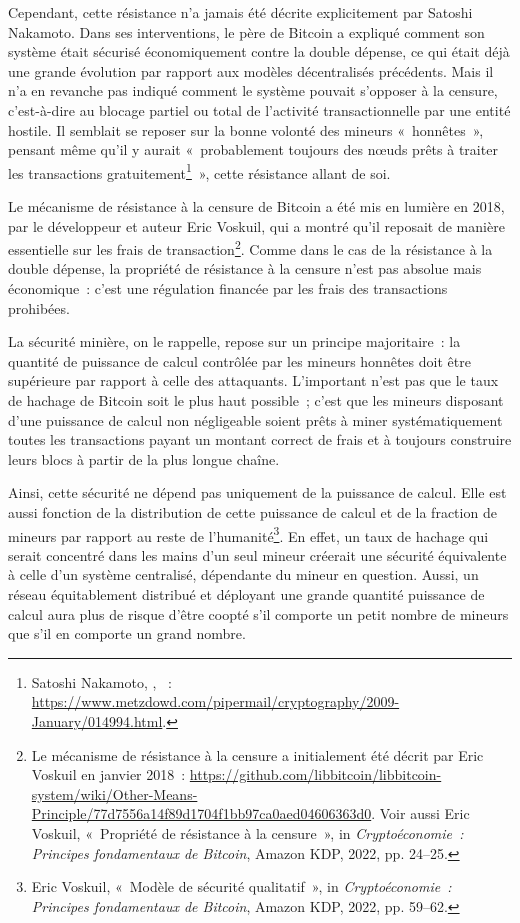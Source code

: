 Cependant, cette résistance n'a jamais été décrite explicitement par Satoshi Nakamoto. Dans ses interventions, le père de Bitcoin a expliqué comment son système était sécurisé économiquement contre la double dépense, ce qui était déjà une grande évolution par rapport aux modèles décentralisés précédents. Mais il n'a en revanche pas indiqué comment le système pouvait s'opposer à la censure, c'est-à-dire au blocage partiel ou total de l'activité transactionnelle par une entité hostile. Il semblait se reposer sur la bonne volonté des mineurs «~honnêtes~», pensant même qu'il y aurait «~probablement toujours des nœuds prêts à traiter les transactions gratuitement\footnote{Satoshi Nakamoto, , ~: \url{https://www.metzdowd.com/pipermail/cryptography/2009-January/014994.html}.}~», cette résistance allant de soi.

Le mécanisme de résistance à la censure de Bitcoin a été mis en lumière en 2018, par le développeur et auteur Eric Voskuil, qui a montré qu'il reposait de manière essentielle sur les frais de transaction\footnote{Le mécanisme de résistance à la censure a initialement été décrit par Eric Voskuil en janvier 2018~: \url{https://github.com/libbitcoin/libbitcoin-system/wiki/Other-Means-Principle/77d7556a14f89d1704f1bb97ca0aed04606363d0}. Voir aussi Eric Voskuil, «~Propriété de résistance à la censure~», in \emph{Cryptoéconomie~: Principes fondamentaux de Bitcoin}, Amazon KDP, 2022, pp. 24--25.}. Comme dans le cas de la résistance à la double dépense, la propriété de résistance à la censure n'est pas absolue mais économique~: c'est une régulation financée par les frais des transactions prohibées.

\clearpage
La sécurité minière, on le rappelle, repose sur un principe majoritaire~: la quantité de puissance de calcul contrôlée par les mineurs honnêtes doit être supérieure par rapport à celle des attaquants. L'important n'est pas que le taux de hachage de Bitcoin soit le plus haut possible~; c'est que les mineurs disposant d'une puissance de calcul non négligeable soient prêts à miner systématiquement toutes les transactions payant un montant correct de frais et à toujours construire leurs blocs à partir de la plus longue chaîne. %

Ainsi, cette sécurité ne dépend pas uniquement de la puissance de calcul. Elle est aussi fonction de la distribution de cette puissance de calcul et de la fraction de mineurs par rapport au reste de l'humanité\footnote{Eric Voskuil, «~Modèle de sécurité qualitatif~», in \emph{Cryptoéconomie~: Principes fondamentaux de Bitcoin}, Amazon KDP, 2022, pp. 59--62.}. En effet, un taux de hachage qui serait concentré dans les mains d'un seul mineur créerait une sécurité équivalente à celle d'un système centralisé, dépendante du mineur en question. Aussi, un réseau équitablement distribué et déployant une grande quantité puissance de calcul aura plus de risque d'être coopté s'il comporte un petit nombre de mineurs que s'il en comporte un grand nombre.


